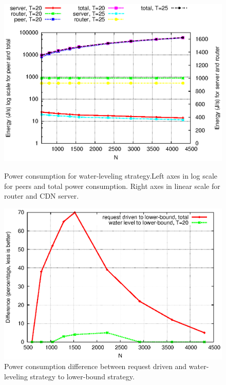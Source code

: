 \documentclass[conference]{IEEEtran}
\begin{document}
\begin{figure}[htp!]
\hfill
\centering
\begin{minipage}[b]{0.4\linewidth}
	\includegraphics[scale=0.45]{graphs/wl-energy.eps}
	\caption{Power consumption for water-leveling strategy.Left axes in log scale for peers and total power consumption. Right axes in linear scale for router and CDN server.}
	\label{fig:wl-energy}
\end{minipage}
\hfill
\centering
\begin{minipage}[b]{0.4\linewidth}
	\includegraphics[scale=0.45]{graphs/diff-12.eps}
	\caption{Power consumption difference between request driven and water-leveling strategy to lower-bound strategy.}
	\label{fig:diff-12}
\end{minipage}
\label{fig:powereachstrategy}
\end{figure}
\end{document}
